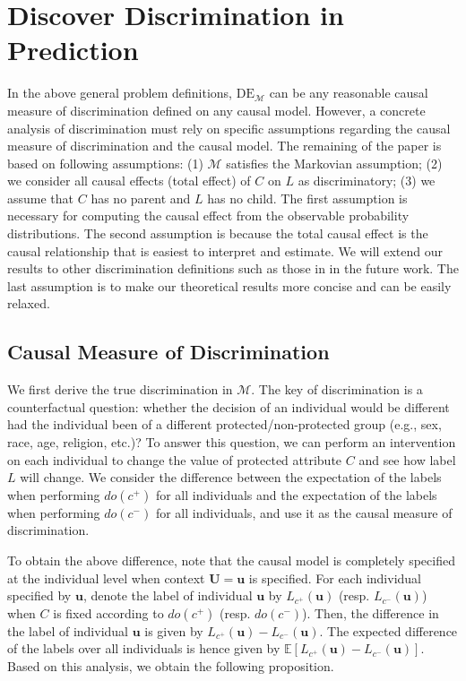 \documentclass{article}
\begin{document}
\section{Discover Discrimination in Prediction}
In the above general problem definitions, $\mathrm{DE}_{\mathcal{M}}$ can be any reasonable causal measure of discrimination defined on any causal model. However, a concrete analysis of discrimination must rely on specific assumptions regarding the causal measure of discrimination and the causal model. The remaining of the paper is based on following assumptions: (1) $\mathcal{M}$ satisfies the Markovian assumption; (2) we consider all causal effects (total effect) of $C$ on $L$ as discriminatory; (3) we assume that $C$ has no parent and $L$ has no child. The first assumption is necessary for computing the causal effect from the observable probability distributions. The second assumption is because the total causal effect is the causal relationship that is easiest to interpret and estimate. We will extend our results to other discrimination definitions such as those in \cite{zhang2017causal,bonchi2017exposing} in the future work. The last assumption is to make our theoretical results more concise and can be easily relaxed.

\subsection{Causal Measure of Discrimination}
We first derive the true discrimination in $\mathcal{M}$. The key of discrimination is a counterfactual question: whether the decision of an individual would be different had the individual been of a different protected/non-protected group (e.g., sex, race, age, religion, etc.)? To answer this question, we can perform an intervention on each individual to change the value of protected attribute $C$ and see how label $L$ will change. We consider the difference between the expectation of the labels when performing $do(c^{+})$ for all individuals and the expectation of the labels when performing $do(c^{-})$ for all individuals, and use it as the causal measure of discrimination.

To obtain the above difference, note that the causal model is completely specified at the individual level when context $\mathbf{U}=\mathbf{u}$ is specified. For each individual specified by $\mathbf{u}$, denote the label of individual $\mathbf{u}$ by $L_{c^{+}}(\mathbf{u})$ (resp. $L_{c^{-}}(\mathbf{u})$) when $C$ is fixed according to $do(c^{+})$ (resp. $do(c^{-})$). Then, the difference in the label of individual $\mathbf{u}$ is given by $L_{c^{+}}(\mathbf{u}) - L_{c^{-}}(\mathbf{u})$. The expected difference of the labels over all individuals is hence given by $\mathbb{E}[ L_{c^{+}}(\mathbf{u}) - L_{c^{-}}(\mathbf{u}) ]$. 
Based on this analysis, we obtain the following proposition.
\end{document}
